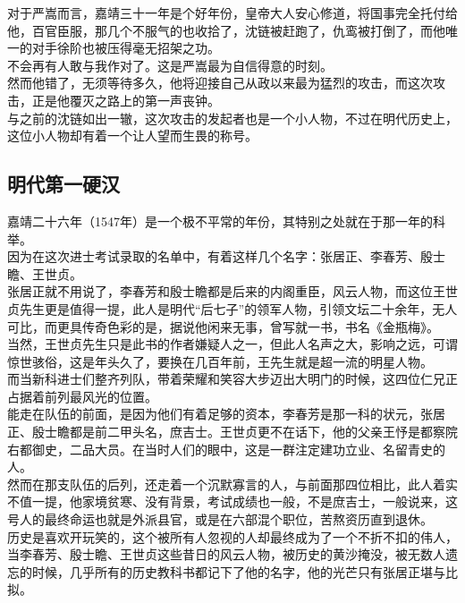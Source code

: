 \begin{multicols}{\theparacolNo}
对于严嵩而言，嘉靖三十一年是个好年份，皇帝大人安心修道，将国事完全托付给他，百官臣服，那几个不服气的也收拾了，沈链被赶跑了，仇鸾被打倒了，而他唯一的对手徐阶也被压得毫无招架之功。\\

不会再有人敢与我作对了。这是严嵩最为自信得意的时刻。\\

然而他错了，无须等待多久，他将迎接自己从政以来最为猛烈的攻击，而这次攻击，正是他覆灭之路上的第一声丧钟。\\

与之前的沈链如出一辙，这次攻击的发起者也是一个小人物，不过在明代历史上，这位小人物却有着一个让人望而生畏的称号。\\

\subsection{明代第一硬汉}
嘉靖二十六年（1547年）是一个极不平常的年份，其特别之处就在于那一年的科举。\\

因为在这次进士考试录取的名单中，有着这样几个名字：张居正、李春芳、殷士瞻、王世贞。\\

张居正就不用说了，李春芳和殷士瞻都是后来的内阁重臣，风云人物，而这位王世贞先生更是值得一提，此人是明代“后七子”的领军人物，引领文坛二十余年，无人可比，而更具传奇色彩的是，据说他闲来无事，曾写就一书，书名《金瓶梅》。\\

当然，王世贞先生只是此书的作者嫌疑人之一，但此人名声之大，影响之远，可谓惊世骇俗，这是年头久了，要换在几百年前，王先生就是超一流的明星人物。\\

而当新科进士们整齐列队，带着荣耀和笑容大步迈出大明门的时候，这四位仁兄正占据着前列最风光的位置。\\

能走在队伍的前面，是因为他们有着足够的资本，李春芳是那一科的状元，张居正、殷士瞻都是前二甲头名，庶吉士。王世贞更不在话下，他的父亲王忬是都察院右都御史，二品大员。在当时人们的眼中，这是一群注定建功立业、名留青史的人。\\

然而在那支队伍的后列，还走着一个沉默寡言的人，与前面那四位相比，此人着实不值一提，他家境贫寒、没有背景，考试成绩也一般，不是庶吉士，一般说来，这号人的最终命运也就是外派县官，或是在六部混个职位，苦熬资历直到退休。\\

历史是喜欢开玩笑的，这个被所有人忽视的人却最终成为了一个不折不扣的伟人，当李春芳、殷士瞻、王世贞这些昔日的风云人物，被历史的黄沙掩没，被无数人遗忘的时候，几乎所有的历史教科书都记下了他的名字，他的光芒只有张居正堪与比拟。\\


\end{multicols}
